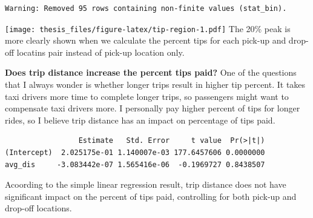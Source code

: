 \documentclass[12pt,twoside]{reedthesis}
\newenvironment{Shaded}{\begin{snugshade}}{\end{snugshade}}
\newcommand{\KeywordTok}[1]{\textcolor[rgb]{0.13,0.29,0.53}{\textbf{#1}}}
\newcommand{\DataTypeTok}[1]{\textcolor[rgb]{0.13,0.29,0.53}{#1}}
\newcommand{\DecValTok}[1]{\textcolor[rgb]{0.00,0.00,0.81}{#1}}
\newcommand{\FloatTok}[1]{\textcolor[rgb]{0.00,0.00,0.81}{#1}}
\newcommand{\StringTok}[1]{\textcolor[rgb]{0.31,0.60,0.02}{#1}}
\newcommand{\CommentTok}[1]{\textcolor[rgb]{0.56,0.35,0.01}{\textit{#1}}}
\newcommand{\OperatorTok}[1]{\textcolor[rgb]{0.81,0.36,0.00}{\textbf{#1}}}
\newcommand{\NormalTok}[1]{#1}
\theoremstyle{definition}
\theoremstyle{definition}
\theoremstyle{definition}
\theoremstyle{remark}
\begin{document}
\begin{Shaded}
\end{Shaded}
\begin{verbatim}
Warning: Removed 95 rows containing non-finite values (stat_bin).
\end{verbatim}
\texttt{[image: thesis\_files/figure-latex/tip-region-1.pdf]} The 20\%
peak is more clearly shown when we calculate the percent tips for each
pick-up and drop-off locatins pair instead of pick-up location only.

\textbf{Does trip distance increase the percent tips paid?} One of the
questions that I always wonder is whether longer trips result in higher
tip percent. It takes taxi drivers more time to complete longer trips,
so passengers might want to compensate taxi drivers more. I personally
pay higher percent of tips for longer rides, so I believe trip distance
has an impact on percentage of tips paid.
\begin{Shaded}
\end{Shaded}
\begin{verbatim}
                 Estimate   Std. Error     t value  Pr(>|t|)
(Intercept)  2.025175e-01 1.140007e-03 177.6457606 0.0000000
avg_dis     -3.083442e-07 1.565416e-06  -0.1969727 0.8438507
\end{verbatim}
Acoording to the simple linear regression result, trip distance does not
have significant impact on the percent of tips paid, controlling for
both pick-up and drop-off locations.
\end{document}
